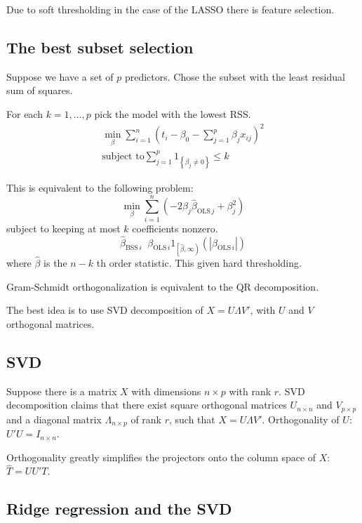 \documentclass[a4paper]{article}
\newcommand{\obj}[1]{{\left\{ #1 \right \}}}
\newcommand{\clop}[1]{{\left [ #1 \right )}}
\newcommand{\brac}[1]{{\left ( #1 \right )}}
\newcommand{\abs}[1]{{\left | #1 \right |}}
\newcommand{\defn}{\mathop{\overset{\Delta}{=}}\nolimits}
\begin{document}
Due to soft thresholding in the case of the LASSO there is feature selection.


\subsection*{The best subset selection} %
\label{sub:the_best_subset_selection}
Suppose we have a set of $p$ predictors. Chose the subset with the least
residual sum of squares.

For each $k = 1,\ldots, p$ pick the model with the lowest RSS.
\begin{align*}
\min_{\beta} \sum_{i=1}^n \brac{t_i - \beta_0 - \sum_{j=1}^p \beta_j x_{ij}}^2 \\
\text{subject to} \sum_{j=1}^p 1_\obj{\beta_j\neq 0} \leq k
\end{align*}

This is equivalent to the following problem:
\[\min_{\beta} \sum_{i=1}^n \brac{ - 2 \beta_j \hat{\beta}_{\text{OLS}\,j} + \beta_j^2 }\]
subject to keeping at most $k$ coefficients nonzero.
\[\hat{\beta}_{\text{BSS}\,i} \defn \beta_{\text{OLS}\,i} 1_{\clop{\hat{\beta}, \infty}}\brac{ \abs{\beta_{\text{OLS}\,i}} }\]
where $\hat{\beta}$ is the $n-k$ th order statistic. This given hard thresholding.

Gram-Schmidt orthogonalization is equivalent to the QR decomposition.

The best idea is to use SVD decomposition of $X = U\Lambda V'$, with $U$ and $V$ orthogonal matrices.


\subsection*{SVD} %
\label{sub:svd}

Suppose there is a matrix $X$ with dimensions $n\times p$ with rank $r$.
SVD decomposition claims that there exist square orthogonal matrices $U_{n\times n}$ and $V_{p\times p}$
and a diagonal matrix $\Lambda_{n\times p}$ of rank $r$, such that $X = U \Lambda V'$.
Orthogonality of $U$: $U'U = I_{n\times n}$.

Orthogonality greatly simplifies the projectors onto the column space of $X$: $\hat{T} = U U' T$.


\subsection*{Ridge regression and the SVD} %
\label{sub:ridge_regression_and_the_svd}
\end{document}
